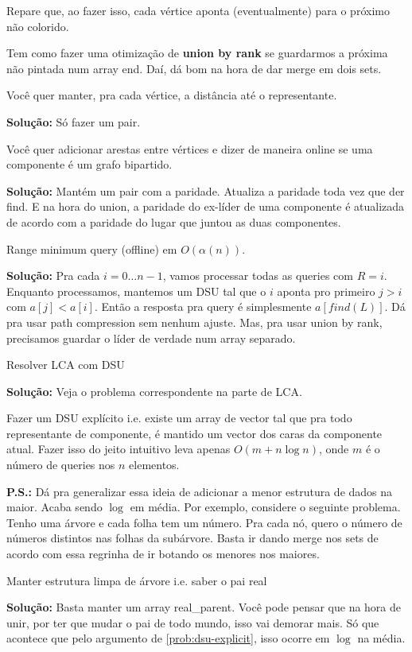 Repare que, ao fazer isso, cada vértice aponta (eventualmente) para o próximo não colorido.


Tem como fazer uma otimização de \textbf{union by rank} se guardarmos a próxima não pintada num array end. Daí,
dá bom na hora de dar merge em dois sets.


 Você quer manter, pra cada vértice, a distância até o representante.

\textbf{Solução:} Só fazer um pair.


 Você quer adicionar arestas entre vértices e dizer de maneira online se uma componente
é um grafo bipartido.

\textbf{Solução:} Mantém um pair com a paridade. Atualiza a paridade toda vez que der find. E na hora do union, a 
paridade do ex-líder de uma componente é atualizada de acordo com a paridade do lugar que juntou as duas componentes.


 Range minimum query (offline) em $O(\alpha(n))$.

\textbf{Solução:} Pra cada $i=0 \dots n-1$, vamos processar todas as queries com $R=i$. Enquanto processamos, mantemos 
um DSU tal que o $i$ aponta pro primeiro $j > i$ com $a[j] < a[i]$. Então a resposta pra query é simplesmente 
$a[find(L)]$. Dá pra usar path compression sem nenhum ajuste. Mas, pra usar union by rank, precisamos guardar o líder
de verdade num array separado. 


 Resolver LCA com DSU

\textbf{Solução:} Veja o problema correspondente na parte de LCA.

 Fazer um DSU explícito i.e. existe um array de vector tal que pra todo representante de
componente, é mantido um vector dos caras da componente atual. Fazer isso do jeito intuitivo leva apenas
$O(m + n \log n)$, onde $m$ é o número de queries nos $n$ elementos.


\textbf{P.S.:} Dá pra generalizar essa ideia de adicionar a menor estrutura de dados na maior. Acaba sendo $\log$
em média. Por exemplo, considere o seguinte problema. Tenho uma árvore e cada folha tem um número. Pra cada nó, quero
o número de números distintos nas folhas da subárvore. Basta ir dando merge nos sets de acordo com essa regrinha de ir
botando os menores nos maiores.

 Manter estrutura limpa de árvore i.e. saber o pai real

\textbf{Solução:} Basta manter um array real\_parent. Você pode pensar que na hora de unir, por ter que mudar o pai de
todo mundo, isso vai demorar mais. Só que acontece que pelo argumento de \ref{prob:dsu-explicit}, isso ocorre em $\log$
na média.